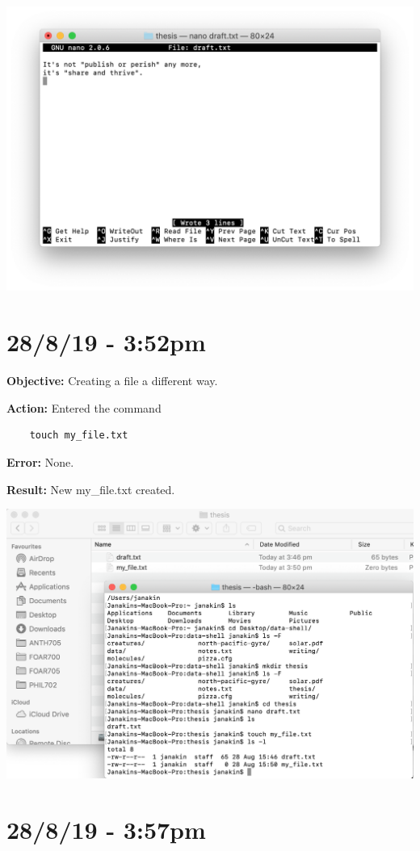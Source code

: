 \documentclass{article}
\begin{document}
\includegraphics[width=\textwidth]{figf.png}

\section*{28/8/19 - 3:52pm}

\textbf{Objective:} Creating a file a different way.

\textbf{Action:} Entered the command \begin{verbatim}
    touch my_file.txt
\end{verbatim}

\textbf{Error:} None.

\textbf{Result:} New my\_file.txt created.

\includegraphics[width=\textwidth]{figg.png}

\section*{28/8/19 - 3:57pm}
\end{document}
